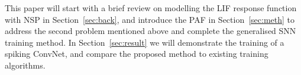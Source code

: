 \documentclass{article}
\begin{document}
	
	
	
	
	This paper will start with a brief review on modelling the LIF response function with NSP in Section~\ref{sec:back}, and introduce the PAF in Section~\ref{sec:meth} to address the second problem mentioned above and complete the generalised SNN training method.
	In Section~\ref{sec:result} we will demonstrate the training of a spiking ConvNet, and compare the proposed method to existing training algorithms.
	
\end{document}
